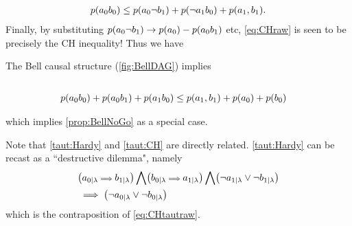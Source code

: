 \begin{EDITING...}
\begin{align}
{\p{a_0 b_0} \leq \p{a_0 \nb_1} + \p{\na_1 b_0} + \p{a_1,b_1}}.
\end{align}
Finally, by substituting $\p{a_0 \nb_1} \to \p{a_0}-\p{a_0 b_1}$ etc, \cref{eq:CHraw} is seen to be precisely the CH inequality! Thus we have
\begin{prop} \label{prop:CH}
The Bell causal structure (\cref{fig:BellDAG}) implies
\begin{align*}
\\&\p{a_0 b_0} +\p{a_0 b_1} + \p{a_1 b_0} \leq \p{a_1,b_1} +\p{a_0} + \p{b_0}
\end{align*}
\end{prop}
\noindent which implies \cref{prop:BellNoGo} as a special case.


Note that \cref{taut:Hardy} and \cref{taut:CH} are directly related. \cref{taut:Hardy} can be recast as a ``destructive dilemma", namely
\begin{align}\begin{split}
&\parens*{a_{0|\lambda} {\scriptstyle \implies}  b_{1|\lambda}} \bigwedge \parens*{b_{0|\lambda} {\scriptstyle \implies}  a_{1|\lambda}} \bigwedge \parens*{\na_{1|\lambda} \lor \nb_{1|\lambda}}\\ &\implies \parens*{\na_{0|\lambda} \lor \nb_{0|\lambda}}
\end{split}\end{align}
which is the contraposition of \cref{eq:CHtautraw}.



\end{EDITING...}
